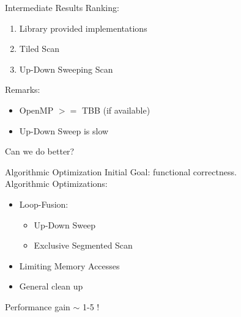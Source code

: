 \begin{frame}{Intermediate Results}
 Ranking:
 \begin{enumerate}
  \item Library provided implementations
  \item Tiled Scan
  \item Up-Down Sweeping Scan 
 \end{enumerate}
 Remarks:
 \begin{itemize}
  \item OpenMP $>=$ TBB (if available)
  \item Up-Down Sweep is slow
 \end{itemize}
 \vspace{10pt}
    \centering Can we do better?
\end{frame}

\begin{frame}{Algorithmic Optimization}
Initial Goal: functional correctness.\\
\vspace{20pt}
Algorithmic Optimizations:
\begin{itemize}
 \item Loop-Fusion:
 \begin{itemize}
  \item Up-Down Sweep
  \item Exclusive Segmented Scan
 \end{itemize}
 \item Limiting Memory Accesses
 \item General clean up
\end{itemize}
\begin{center}
 Performance gain $\sim$ 1-5 \gbs!
\end{center}

\end{frame} 

%  
%  
% 
%  
%  


